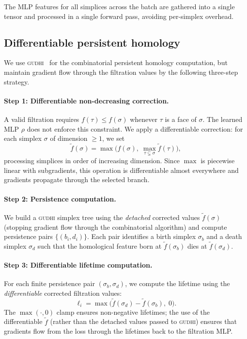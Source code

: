 The MLP features for all simplices across the batch are gathered into a single tensor and processed in a single forward pass, avoiding per-simplex overhead.


\subsection{Differentiable persistent homology}
\label{sec:diff_ph}

We use \textsc{gudhi}~\cite{gudhi2014} for the combinatorial persistent homology computation, but maintain gradient flow through the filtration values by the following three-step strategy.

\paragraph{Step 1: Differentiable non-decreasing correction.}
A valid filtration requires $f(\tau) \leq f(\sigma)$ whenever $\tau$ is a face of $\sigma$. The learned MLP $\rho$ does not enforce this constraint. We apply a differentiable correction: for each simplex $\sigma$ of dimension $\geq 1$, we set
\[
    \tilde{f}(\sigma) = \max\!\big(f(\sigma),\; \max_{\tau \subsetneq \sigma} \tilde{f}(\tau)\big),
\]
processing simplices in order of increasing dimension. Since $\max$ is piecewise linear with subgradients, this operation is differentiable almost everywhere and gradients propagate through the selected branch.

\paragraph{Step 2: Persistence computation.}
We build a \textsc{gudhi} simplex tree using the \emph{detached} corrected values $\tilde{f}(\sigma)$ (stopping gradient flow through the combinatorial algorithm) and compute persistence pairs $\{(b_i, d_i)\}$. Each pair identifies a birth simplex $\sigma_b$ and a death simplex $\sigma_d$ such that the homological feature born at $\tilde{f}(\sigma_b)$ dies at $\tilde{f}(\sigma_d)$.

\paragraph{Step 3: Differentiable lifetime computation.}
For each finite persistence pair $(\sigma_b, \sigma_d)$, we compute the lifetime using the \emph{differentiable} corrected filtration values:
\[
    \ell_i = \max\!\big(\tilde{f}(\sigma_d) - \tilde{f}(\sigma_b),\; 0\big).
\]
The $\max(\cdot, 0)$ clamp ensures non-negative lifetimes; the use of the differentiable $\tilde{f}$ (rather than the detached values passed to \textsc{gudhi}) ensures that gradients flow from the loss through the lifetimes back to the filtration MLP.

